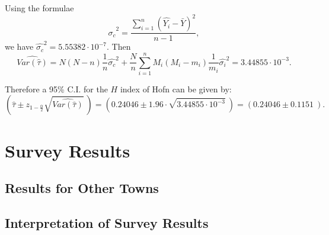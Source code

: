 \documentclass[12pt]{article}%
\begin{document}
Using the formulae 
$$\hat{\sigma_c}^2=\frac{ \sum_{i=1}^n (\hat{Y_i} - \bar{Y})^2 }{n-1},$$
we have $\hat{\sigma_c}^2 = 5.55382\cdot 10^{-7}.$ Then 
$$\widehat{Var(\hat{\tau})} 
= N(N-n)\frac{1}{n}\hat{\sigma_c}^2
+\frac{N}{n}\sum_{i=1}^{n}M_i(M_i-m_i)\frac{1}{m_i}\hat{\sigma_i}^2
=3.44855\cdot 10^{-3}.$$

Therefore a 95\% C.I. for the $H$ index of Hofn can be given by: 
$$(\hat{\tau} \pm z_{1-\frac{\alpha}{2}}\sqrt{\widehat{Var(\hat{\tau})}}~)
=(0.24046 \pm 1.96\cdot \sqrt{3.44855\cdot 10^{-3}}~)
=(0.24046 \pm 0.1151~).$$

\section{Survey Results}
\subsection{Results for Other Towns}
\subsection{Interpretation of Survey Results}
\end{document}
